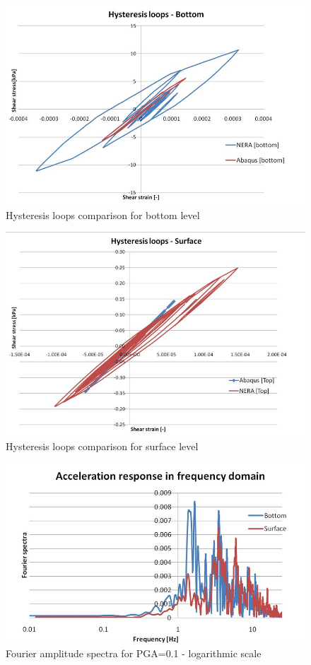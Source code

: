 	\begin{figure}[h!]
		\centering
		\includegraphics[width=0.7\linewidth]{"hysteresis_low_bot"}
		\caption{Hysteresis loops comparison for bottom level}
		\label{hyst_bot}
	\end{figure}
	
	\begin{figure}[h!]
		\centering
		\includegraphics[width=0.7\linewidth]{"hysteresis_low_surf"}
		\caption{Hysteresis loops comparison for surface level}
		\label{hyst_top}
	\end{figure}
	
	\begin{figure}[h!]
		\centering
		\includegraphics[width=0.7\linewidth]{"spectral_low"}
		\caption{Fourier amplitude spectra for PGA=0.1 - logarithmic scale}
		\label{fourier3}
	\end{figure}
	
